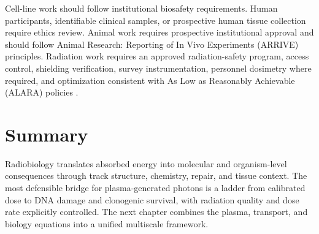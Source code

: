 Cell-line work should follow institutional biosafety requirements. Human participants, identifiable clinical samples, or prospective human tissue collection require ethics review. Animal work requires prospective institutional approval and should follow Animal Research: Reporting of In Vivo Experiments (ARRIVE) principles. Radiation work requires an approved radiation-safety program, access control, shielding verification, survey instrumentation, personnel dosimetry where required, and optimization consistent with As Low as Reasonably Achievable (ALARA) policies \cite{iaeaGSR3,icrp103}.

\section{Summary}

Radiobiology translates absorbed energy into molecular and organism-level consequences through track structure, chemistry, repair, and tissue context. The most defensible bridge for plasma-generated photons is a ladder from calibrated dose to DNA damage and clonogenic survival, with radiation quality and dose rate explicitly controlled. The next chapter combines the plasma, transport, and biology equations into a unified multiscale framework.
